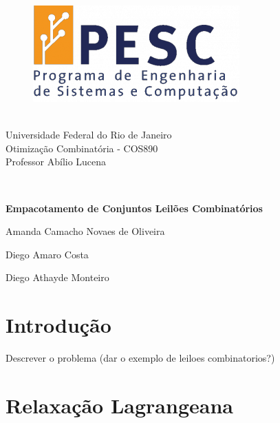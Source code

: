 \documentclass{article}
\begin{document}
	\begin{figure}
		\begin{flushleft}	
			\includegraphics[height=.065\textheight]{PESC.png}
		\end{flushleft}
	\end{figure}
	
	\quad\\
	{Universidade Federal do Rio de Janeiro} \\
	{Otimização Combinatória - COS890} \\
	{Professor Abílio Lucena}
	
	\quad\\
	\vspace*{2cm}
	
	\begin{center}
		\huge\bfseries
		Empacotamento de Conjuntos
		Leilões Combinatórios
	\end{center}
	\vspace*{3mm}
	
	\begin{center}
		\large
		Amanda Camacho Novaes de Oliveira
		
		Diego Amaro Costa	
		
		Diego Athayde Monteiro 
	\end{center}

	\vspace{1cm}
	
	\section{Introdução}
	Descrever o problema (dar o exemplo de leiloes combinatorios?)
	
	
	
	\section{Relaxação Lagrangeana}
	
\end{document}
